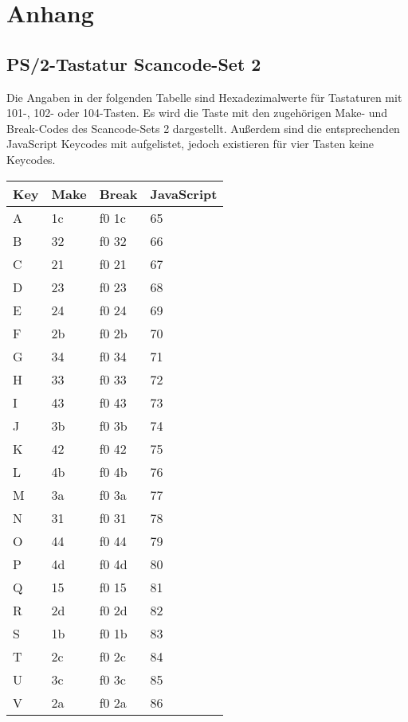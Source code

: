 \chapter{Anhang}
\section{PS/2-Tastatur Scancode-Set 2}
\label{scancode_set_2}
Die Angaben in der folgenden Tabelle sind Hexadezimalwerte für Tastaturen mit 101-, 102- oder 104-Tasten. Es wird die Taste mit den zugehörigen Make- und Break-Codes des Scancode-Sets 2 dargestellt. Außerdem sind die entsprechenden JavaScript Keycodes mit aufgelistet, jedoch existieren für vier Tasten keine Keycodes.

\begin{longtable}{| p{} | p{} | p{} | p{} |}
  \hline
  \textbf{Key} & \textbf{Make} & \textbf{Break} & \textbf{JavaScript}\\ \hline
  A & 1c & f0 1c & 65 \\ \hline
  B & 32 & f0 32 & 66 \\ \hline
  C & 21 & f0 21 & 67 \\ \hline
  D & 23 & f0 23 & 68 \\ \hline
  E & 24 & f0 24 & 69 \\ \hline
  F & 2b & f0 2b & 70 \\ \hline
  G & 34 & f0 34 & 71 \\ \hline
  H & 33 & f0 33 & 72 \\ \hline
  I & 43 & f0 43 & 73 \\ \hline
  J & 3b & f0 3b & 74 \\ \hline
  K & 42 & f0 42 & 75 \\ \hline
  L & 4b & f0 4b & 76 \\ \hline
  M & 3a & f0 3a & 77 \\ \hline
  N & 31 & f0 31 & 78 \\ \hline
  O & 44 & f0 44 & 79 \\ \hline
  P & 4d & f0 4d & 80 \\ \hline
  Q & 15 & f0 15 & 81 \\ \hline
  R & 2d & f0 2d & 82 \\ \hline
  S & 1b & f0 1b & 83 \\ \hline
  T & 2c & f0 2c & 84 \\ \hline
  U & 3c & f0 3c & 85 \\ \hline
  V & 2a & f0 2a & 86 \\ \hline

\end{longtable}
